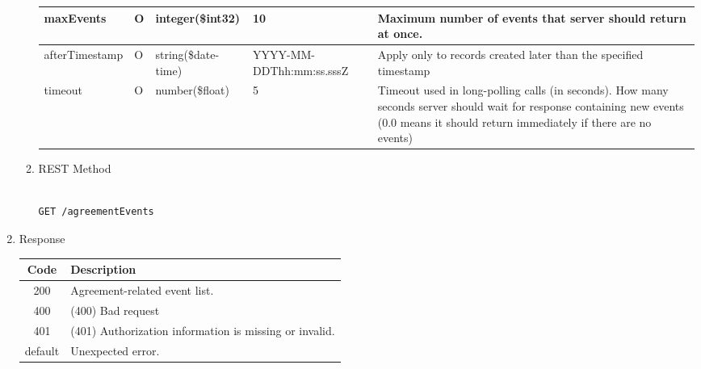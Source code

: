 \begin{enumerate}
\begin{enumerate}
\begin{table}[H]
\begin{center}
\begin{tabular}{|p{3cm}|l|p{3cm}|p{3cm}|p{4cm}|}
maxEvents			& O	& 	integer(\$int32)		&	10	&	Maximum number of events that server should return at once. \\ 
\hline

afterTimestamp	& O &	string(\$date-time)	&	YYYY-MM-DDThh:mm:ss.sssZ	&	Apply only to records created later than the specified timestamp \\
\hline

timeout	& O &	number(\$float)	&	5	&	Timeout used in long-polling calls (in seconds). 
											How many seconds server should wait for response containing new events 
											(0.0 means it should return immediately if there are no events) \\
\hline

\end{tabular}
\end{center}

\end{table}

\item REST Method

\begin{tcolorbox}[boxrule=0pt, frame empty]
\begin{verbatim} 

GET /agreementEvents

\end{verbatim}
\end{tcolorbox}

\end{enumerate}

\item Response

\begin{table}[H]
\footnotesize

\begin{center}
\begin{tabular}{|c|l|} 
\hline
\rowcolor{lightgray}	Code 		& 	Description \\
\hline
200	 		&	Agreement-related event list. \\
\hline
400			&	(400) Bad request \\
\hline
401			&	(401) Authorization information is missing or invalid. \\
\hline
default		&	Unexpected error. \\
\hline
\end{tabular}
\end{center}

\end{table}


\end{enumerate}
